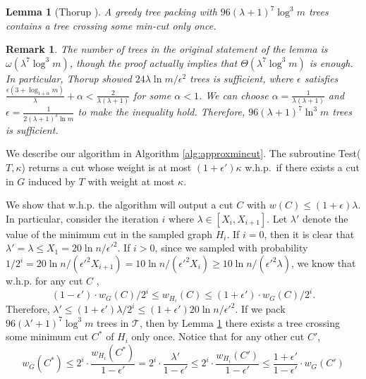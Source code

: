 \documentclass[11pt]{article}
\newtheorem{lemma}[theorem]{Lemma}
\newtheorem{remark}[theorem]{Remark}
\begin{document}
\begin{lemma}[Thorup \cite{Thorup07}]\label{lem:treepacking}A greedy tree packing with $96 (\lambda+1)^7 \log^3 m$ trees contains a tree crossing some min-cut only once.
\end{lemma}
\begin{remark}The number of trees in the original statement of the lemma is $\omega(\lambda^7 \log^3 m)$, though the proof actually implies that $\Theta( \lambda^7 \log^3 m)$ is enough. In particular, Thorup showed $24\lambda \ln m /\epsilon^2$ trees is sufficient, where $\epsilon$ satisfies $\frac{\epsilon(3+\log_{1+\alpha} m)}{\lambda} + \alpha < \frac{2}{\lambda(\lambda+1)}$ for some $\alpha < 1$. We can choose $\alpha = \frac{1}{\lambda(\lambda+1)}$ and $\epsilon = \frac{1}{2(\lambda + 1)^3 \ln m}$ to make the inequality hold. Therefore, $96 (\lambda+1)^{7} \ln^3 m$ trees is sufficient.\end{remark}

We describe our algorithm in Algorithm \ref{alg:approxmincut}. The subroutine Test($T, \kappa$) returns a cut whose weight is at most $(1+\epsilon') \kappa$ w.h.p.~if there exists a cut in $G$ induced by $T$ with weight at most $\kappa$.

We show that w.h.p. the algorithm will output a cut $C$ with $w(C) \leq (1+\epsilon)\lambda$. In particular, consider the iteration $i$ where $\lambda \in [X_i, X_{i+1}]$. Let $\lambda'$ denote the value of the minimum cut in the sampled graph $H_i$. If $i = 0$, then it is clear that $\lambda' = \lambda \leq X_1 = 20\ln n / \epsilon'^2$. If $i>0$, since we sampled with probability $1/2^{i} = 20 \ln n / (\epsilon'^2 X_{i+1})= 10\ln n / (\epsilon'^2 X_{i}) \geq 10\ln n / (\epsilon'^2\lambda)$, we know that w.h.p. for any cut $C$ \cite[Corollary 2.4]{Karger94}, $$(1 - \epsilon') \cdot w_{G}(C) / 2^{i} \leq w_{H_{i}}(C) \leq (1 + \epsilon') \cdot w_{G}(C) / 2^{i}.$$
Therefore, $\lambda' \leq (1+\epsilon') \lambda / 2^{i} \leq (1+\epsilon')20\ln n / \epsilon'^2$. If we pack $96 (\lambda'+1)^7 \log^{3} m$ trees in $\mathcal{T}$, then by Lemma \ref{lem:treepacking} there exists a tree crossing some minimum cut $C^{*}$ of $H_i$ only once. Notice that for any other cut $C'$, $$w_{G}(C^{*}) \leq 2^{i} \cdot \frac{w_{H_i}(C^{*})}{1-\epsilon'} = 2^{i} \cdot \frac{\lambda'}{1-\epsilon'} \leq 2^{i} \cdot \frac{w_{H_{i}}(C')}{1-\epsilon'} \leq \frac{1+\epsilon'}{1-\epsilon'} \cdot w_{G}(C')$$
\end{document}

